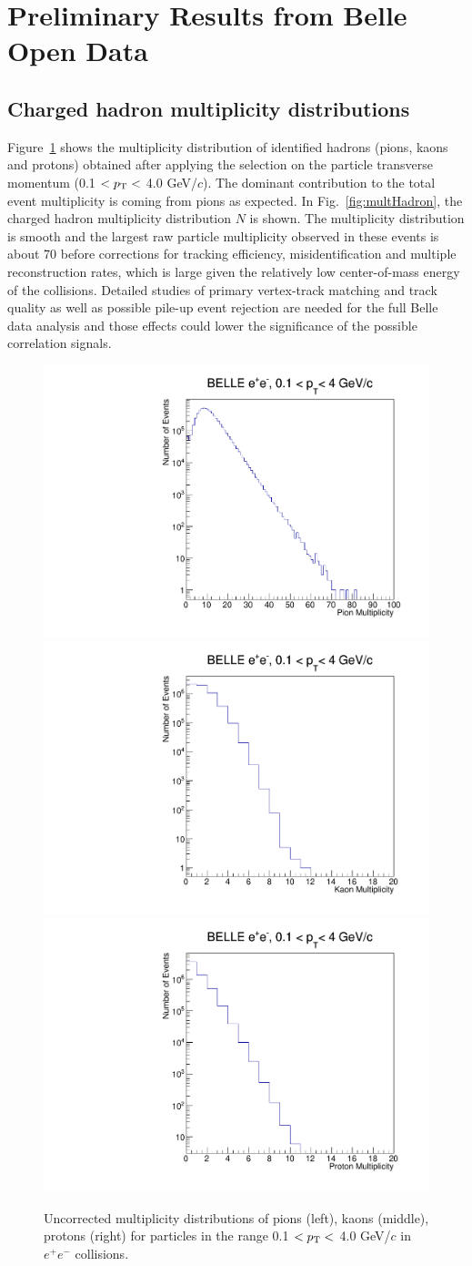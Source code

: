 \section{Preliminary Results from Belle Open Data}

\subsection{Charged hadron multiplicity distributions}

Figure~\ref{fig:multPID} shows the multiplicity distribution of identified hadrons (pions, kaons and protons) obtained after 
applying the selection on the particle transverse momentum (0.1 $<p_{\rm T}<$ 4.0 GeV/$c$). 
The dominant contribution to the total event multiplicity is coming from pions as expected.
In Fig.~\ref{fig:multHadron}, the charged hadron multiplicity distribution $N$ is shown. The multiplicity distribution is smooth and the largest raw particle multiplicity observed in these events is about 70 before corrections for tracking efficiency, misidentification and multiple reconstruction rates, which is large given the relatively low center-of-mass energy of the collisions. Detailed studies of primary vertex-track matching and track quality as well as possible pile-up event rejection are needed for the full Belle data analysis and those effects could lower the significance of the possible correlation signals.

\begin{figure}[!htb]
\begin{center}
\includegraphics[width=.32\textwidth]{figures/pion_mult.pdf}
\includegraphics[width=.32\textwidth]{figures/kaon_mult.pdf}
\includegraphics[width=.32\textwidth]{figures/proton_mult.pdf}
\caption{Uncorrected multiplicity distributions of pions (left), kaons (middle), protons (right) for  particles in the range  0.1 $<p_{\rm T}<$ 4.0 GeV/$c$ in $e^{+}e^{-}$ collisions. }
\label{fig:multPID} 
\end{center}
\end{figure}

